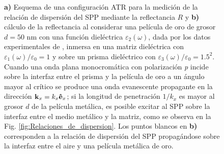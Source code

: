 \begin{figure}[h!]
\begin{subfigure}{.45\linewidth}
\vspace*{-.5em}	
	
	\end{subfigure}\hfill	\vspace*{-.7em}
	\caption{\textbf{a)} Esquema de una configuración ATR para la medición de la relación de dispersión del SPP mediante la reflectancia $R$ y \textbf{b)}  cálculo de la reflectancia al considerar una película de oro de grosor $d=50$ nm con una función dieléctrica $\varepsilon_2(\omega)$, dada por los datos experimentales de \cite{johnson1972constants}, inmersa en una matriz dieléctrica con $\varepsilon_1(\omega)/\varepsilon_0 = 1$ y sobre un prisma dieléctrico con $\varepsilon_3(\omega)/\varepsilon_0=1.5^2$. Cuando una onda plana monocromática con polarización \emph{p} incide sobre la interfaz entre el prisma y la película de oro a un ángulo mayor al crítico se produce una onda evanescente propagante en la dirección $\vb{k}_x=k_x\vu{e}_x$; si la longitud de penetración $1/k_x$ es mayor al grosor $d$ de la película metálica, es posible excitar al SPP sobre la interfaz entre el medio metálico y la matriz, como se observa en la Fig. \ref{fig:Relaciones_de_dispersion}. Los puntos blancos en \textbf{b)} corresponden a la relación de dispersión del SPP propagándose sobre la interfaz entre el aire y una película metálica de oro.}\label{fig:ATR-SPP}
	\end{figure}			
		
